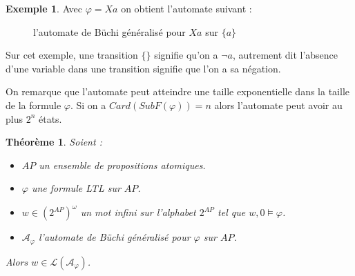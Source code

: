 \documentclass[12pt,a4paper]{article}
\theoremstyle{plain}
\newtheorem{thm}{Théorème}
\theoremstyle{definition}
\newtheorem{ex}{Exemple}
\begin{document}
\newpage
\begin{ex}
  Avec $\varphi = Xa$ on obtient l'automate suivant :
  \begin{figure}[h]
    \centering
    \caption{l'automate de Büchi généralisé pour $Xa$ sur $\{a\}$}
  \end{figure}
  
  Sur cet exemple, une transition $\{\}$ signifie qu'on a $\lnot a$, autrement dit l'absence d'une variable dans une transition signifie que l'on a sa négation.
\end{ex}

On remarque que l'automate peut atteindre une taille exponentielle dans la taille de la formule $\varphi$.
Si on a $Card(SubF(\varphi)) = n$ alors l'automate peut avoir au plus $2^n$ états.

\begin{thm}
	\label{thm1}
  Soient :
  \begin{itemize}
  \item $AP$ un ensemble de propositions atomiques.
  \item $\varphi$ une formule LTL sur $AP$.
  \item $w \in (2^{AP})^\omega$ un mot infini sur l'alphabet $2^{AP}$ tel que $w, 0 \models \varphi$.
  \item $\mathcal{A}_\varphi$ l'automate de Büchi généralisé pour $\varphi$ sur $AP$.
  \end{itemize}
  Alors $w \in \mathcal{L}(\mathcal{A}_\varphi)$. 
\end{thm}
\end{document}
